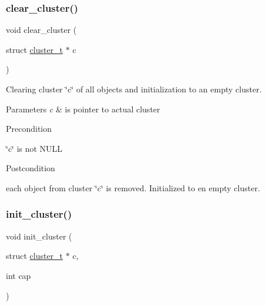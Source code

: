 \subsubsection{\texorpdfstring{clear\+\_\+cluster()}{clear\_cluster()}}
{\footnotesize\ttfamily void clear\+\_\+cluster (\begin{DoxyParamCaption}\item[{struct \mbox{\hyperlink{structcluster__t}{cluster\+\_\+t}} $\ast$}]{c }\end{DoxyParamCaption})}



Clearing cluster \char`\"{}c\char`\"{} of all objects and initialization to an empty cluster. 


\begin{DoxyParams}{Parameters}
{\em c} & is pointer to actual cluster\\
\hline
\end{DoxyParams}
\begin{DoxyPrecond}{Precondition}

\begin{DoxyItemize}
\item \char`\"{}c\char`\"{} is not N\+U\+LL
\end{DoxyItemize}
\end{DoxyPrecond}
\begin{DoxyPostcond}{Postcondition}

\begin{DoxyItemize}
\item each object from cluster \char`\"{}c\char`\"{} is removed. Initialized to en empty cluster. 
\end{DoxyItemize}
\end{DoxyPostcond}
\mbox{\label{group___cluster_operations_ga96db0862471d90abb3d80103ef3695f7}} 
\subsubsection{\texorpdfstring{init\+\_\+cluster()}{init\_cluster()}}
{\footnotesize\ttfamily void init\+\_\+cluster (\begin{DoxyParamCaption}\item[{struct \mbox{\hyperlink{structcluster__t}{cluster\+\_\+t}} $\ast$}]{c,  }\item[{int}]{cap }\end{DoxyParamCaption})}



